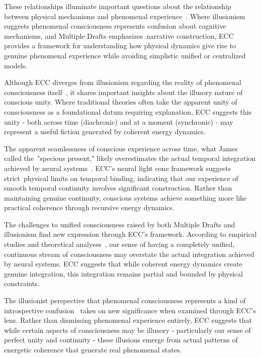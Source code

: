 These relationships illuminate important questions about the relationship between physical mechanisms and phenomenal experience~\cite{Pereboom2011, Chalmers2018}. Where illusionism suggests phenomenal consciousness represents confusion about cognitive mechanisms, and Multiple Drafts emphasizes~narrative construction, ECC provides a framework for understanding how physical dynamics give rise to genuine phenomenal experience while avoiding simplistic unified or centralized models.

Although ECC diverges from illusionism regarding the reality of phenomenal consciousness itself~\cite{Frankish2019, Dennett2016}, it shares important insights about the illusory nature of conscious unity. Where traditional theories often take the apparent unity of consciousness as a foundational datum requiring explanation, ECC suggests this unity - both across time (diachronic) and at a moment (synchronic) - may represent a useful fiction generated by coherent energy dynamics.

The apparent seamlessness of conscious experience across time, what James called the~"specious present," likely overestimates the actual temporal integration achieved by neural systems~\cite{VanGulick2018, Dennett1992}. ECC's neural light cone framework suggests strict~physical limits on temporal binding, indicating that our experience of smooth temporal continuity involves significant construction. Rather than maintaining genuine continuity, conscious systems achieve something more like practical coherence through recursive energy dynamics.

The challenges to unified consciousness raised by both Multiple Drafts and illusionism find new expression through ECC's framework. According to empirical studies and theoretical analyses~\cite{Schwitzgebel2011, Block2007}, our sense of having a completely unified, continuous stream of consciousness may overstate the actual integration achieved by neural systems. ECC suggests that while coherent energy dynamics create genuine integration, this integration remains partial and bounded by physical constraints.

The illusionist perspective that phenomenal consciousness represents a kind of introspective confusion~\cite{Frankish2016, Chalmers2018} takes on new significance when examined through ECC's lens. Rather than dismissing phenomenal experience entirely, ECC suggests that while certain aspects of consciousness may be illusory - particularly our sense of perfect unity and continuity - these illusions emerge from actual patterns of energetic coherence that generate real phenomenal states.

